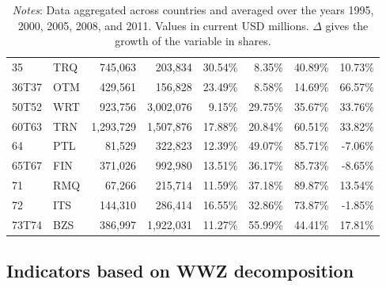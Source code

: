 \documentclass[a4paper,11pt]{article}
\begin{document}
\begin{table}[h]
\begin{tabular}{llrrrrrr}
    35    & TRQ   & 745,063 & 203,834 & 30.54\% & 8.35\% & 40.89\% & 10.73\% \\
    36T37 & OTM   & 429,561 & 156,828 & 23.49\% & 8.58\% & 14.69\% & 66.57\% \\
    50T52 & WRT   & 923,756 & 3,002,076 & 9.15\% & 29.75\% & 35.67\% & 33.76\% \\
    60T63 & TRN   & 1,293,729 & 1,507,876 & 17.88\% & 20.84\% & 60.51\% & 33.82\% \\
    64    & PTL   & 81,529 & 322,823 & 12.39\% & 49.07\% & 85.71\% & -7.06\% \\
    65T67 & FIN   & 371,026 & 992,980 & 13.51\% & 36.17\% & 85.73\% & -8.65\% \\
    71    & RMQ   & 67,266 & 215,714 & 11.59\% & 37.18\% & 89.87\% & 13.54\% \\
    72    & ITS   & 144,310 & 286,414 & 16.55\% & 32.86\% & 73.87\% & -1.85\% \\
    73T74 & BZS   & 386,997 & 1,922,031 & 11.27\% & 55.99\% & 44.41\% & 17.81\% \\
    \bottomrule
    \end{tabular}
      \caption*{\textit{Notes}: Data aggregated across countries and averaged over the years 1995, 2000, 2005, 2008, and 2011. Values in current USD millions. $\Delta$ gives the growth of the variable in shares.}
  \label{tab:gvc_s}
\end{table}

\vspace*{\fill}

\newpage

\subsection{Indicators based on WWZ decomposition}
\end{document}
